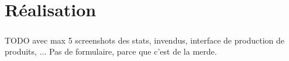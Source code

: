\chapter{Réalisation}

\paragraph{}
TODO avec max 5 screenshots des stats, invendus, interface de production de produits, ...
Pas de formulaire, parce que c'est de la merde.
